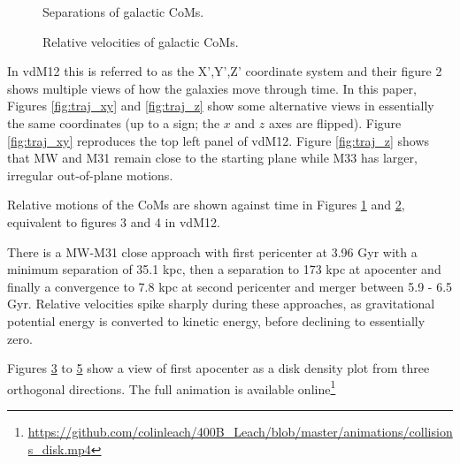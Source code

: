 \documentclass[twocolumn]{aastex63}
\begin{document}
\begin{figure}[hbt!]
	\caption{Separations of galactic CoMs.
		\label{fig:rel_sep}}
\end{figure}

\begin{figure}[hbt!]
	\caption{Relative velocities of galactic CoMs.
		\label{fig:rel_vel}}
\end{figure}

In vdM12 this is referred to as the X',Y',Z' coordinate system and their figure 2 shows multiple views of how the galaxies move through time. In this paper, Figures \ref{fig:traj_xy} and  \ref{fig:traj_z} show some alternative views in essentially the same coordinates (up to a sign; the $x$ and $z$ axes are flipped). Figure \ref{fig:traj_xy} reproduces the top left panel of vdM12. Figure \ref{fig:traj_z} shows that MW and M31 remain close to the starting plane while M33 has larger, irregular out-of-plane motions.

Relative motions of the CoMs are shown against time in Figures \ref{fig:rel_sep} and \ref{fig:rel_vel}, equivalent to figures 3 and 4 in vdM12.

There is a MW-M31 close approach with first pericenter at 3.96 Gyr with a minimum separation of 35.1 kpc, then a separation to 173 kpc at apocenter and finally a convergence to 7.8 kpc at second pericenter and merger between 5.9 - 6.5 Gyr. Relative velocities spike sharply during these approaches, as gravitational potential energy is converted to kinetic energy, before declining to essentially zero.

\begin{figure}[hbt!]
	\caption{\label{fig:3view_first_apo_a}}
\end{figure} %

\begin{figure}[hbt!]
	\caption{\label{fig:3view_first_apo_b}}
\end{figure} %

\begin{figure}[hbt!]
	\caption{\label{fig:3view_first_apo_c}}
\end{figure}

Figures \ref{fig:3view_first_apo_a} to \ref{fig:3view_first_apo_c} show a view of first apocenter as a disk density plot from three orthogonal directions. The full animation is available online\footnote{\url{https://github.com/colinleach/400B_Leach/blob/master/animations/collisions_disk.mp4}}
\end{document}
